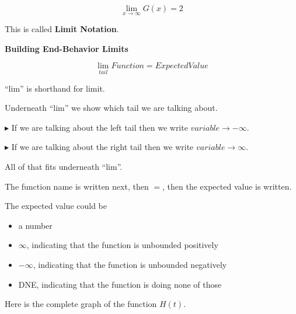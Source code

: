 \documentclass{ximera}
\begin{document}
\[
\lim\limits_{x \to \infty} G(x) = 2
\]


This is called \textbf{Limit Notation}.


\begin{notation} \textbf{\textcolor{red!50!green}{Building End-Behavior Limits}}  




\[
\lim\limits_{tail} Function = Expected Value
\]



``lim'' is shorthand for limit.  


Underneath ``lim'' we show which tail we are talking about. 


$\blacktriangleright$ If we are talking about the left tail then we write $variable \to -\infty$.

$\blacktriangleright$ If we are talking about the right tail then we write $variable \to \infty$.

All of that fits underneath ``lim''.



The function name is written next, then $=$, then the expected value is written.



The expected value could be 

\begin{itemize}
\item a number
\item $\infty$, indicating that the function is unbounded positively
\item $-\infty$, indicating that the function is unbounded negatively
\item DNE, indicating that the function is doing none of those
\end{itemize}


\end{notation}












Here is the complete graph of the function $H(t)$. 
\end{document}
